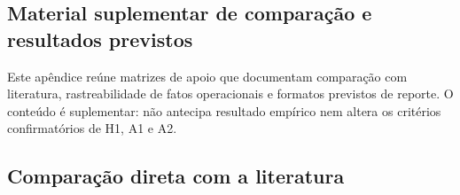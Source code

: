 \documentclass[
  12pt,
  oneside,
  a4paper,
  sumario=tradicional,
  brazil
]{abntex2}
\begin{document}
\begin{apendicesenv}

\chapter{Material suplementar de compara\c{c}\~ao e resultados previstos}\label{apx:material-suplementar}

Este ap\^endice re\'une matrizes de apoio que documentam compara\c{c}\~ao com literatura, rastreabilidade de fatos operacionais e formatos previstos de reporte. O conte\'udo \'e suplementar: n\~ao antecipa resultado emp\'irico nem altera os crit\'erios confirmat\'orios de H1, A1 e A2.

\section{Compara\c{c}\~ao direta com a literatura}


\end{apendicesenv}
\end{document}
